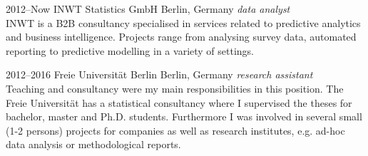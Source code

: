 \documentclass[]{friggeri-cv} %
\begin{document}
\begin{entrylist}


\entry
{2012--Now}
{INWT Statistics GmbH}
{Berlin, Germany}
{\emph{data analyst} \\ 
INWT is a B2B consultancy specialised in services related to predictive analytics and business intelligence. Projects range from analysing survey data, automated reporting to predictive modelling in a variety of settings.
}


\entry
{2012--2016}
{Freie Universit\"at Berlin}
{Berlin, Germany}
{\emph{research assistant} \\
Teaching and consultancy were my main responsibilities in this position. The Freie Universit\"at has a statistical consultancy where I supervised the theses for bachelor, master and Ph.D. students. Furthermore I was involved in several small (1-2 persons) projects for companies as well as research institutes, e.g. ad-hoc data analysis or methodological reports.}


\end{entrylist}


%
%
%
%
%
%
%
%
%
%
\end{document}
